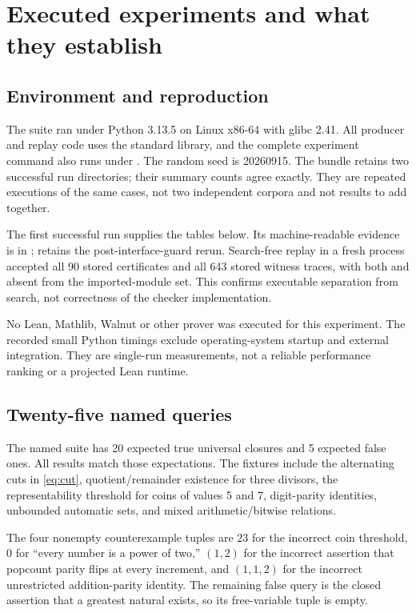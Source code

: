 \section{Executed experiments and what they establish}\label{sec:experiments}

\subsection{Environment and reproduction}
The suite ran under Python 3.13.5 on Linux x86-64 with glibc 2.41. All producer and replay code uses the standard library, and the complete experiment command also runs under . The random seed is 20260915. The bundle retains two successful run directories; their summary counts agree exactly. They are repeated executions of the same cases, not two independent corpora and not results to add together.

The first successful run supplies the tables below. Its machine-readable evidence is in ;  retains the post-interface-guard rerun. Search-free replay in a fresh process accepted all 90 stored certificates and all 643 stored witness traces, with both  and  absent from the imported-module set. This confirms executable separation from search, not correctness of the checker implementation.

No Lean, Mathlib, Walnut or other prover was executed for this experiment. The recorded small Python timings exclude operating-system startup and external integration. They are single-run measurements, not a reliable performance ranking or a projected Lean runtime.

\subsection{Twenty-five named queries}
The named suite has 20 expected true universal closures and 5 expected false ones. All results match those expectations. The fixtures include the alternating cuts in \eqref{eq:cut}, quotient/remainder existence for three divisors, the representability threshold for coins of values 5 and 7, digit-parity identities, unbounded automatic sets, and mixed arithmetic/bitwise relations.



The four nonempty counterexample tuples are \(23\) for the incorrect coin threshold, \(0\) for ``every number is a power of two,'' \((1,2)\) for the incorrect assertion that popcount parity flips at every increment, and \((1,1,2)\) for the incorrect unrestricted addition-parity identity. The remaining false query is the closed assertion that a greatest natural exists, so its free-variable tuple is empty.

